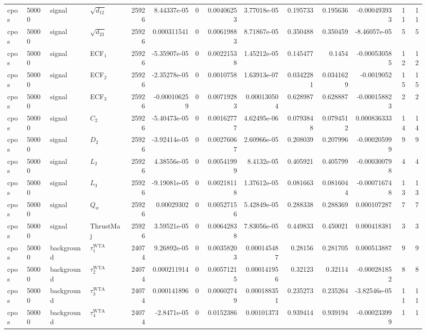 \begin{landscape}
\begin{longtable}{llll r rrrr rr r rr}
cpos & 50000 & signal & $\sqrt{d_{12}}$ & 25926 & 8.44337e-05 & 0 & 0.00406253 & 3.77018e-05 & 0.195733 & 0.195636 & -0.000493933 & 11 & 11 \\
cpos & 50000 & signal & $\sqrt{d_{23}}$ & 25926 & 0.000311541 & 0 & 0.00619883 & 8.71867e-05 & 0.350488 & 0.350459 & -8.46057e-05 & 5 & 5 \\
cpos & 50000 & signal & ECF$_1$ & 25926 & -5.35907e-05 & 0 & 0.00221538 & 1.45212e-05 & 0.145477 & 0.1454 & -0.000530585 & 12 & 12 \\
cpos & 50000 & signal & ECF$_2$ & 25926 & -2.35278e-05 & 0 & 0.0010758 & 1.63913e-07 & 0.0342281 & 0.0341629 & -0.0019052 & 15 & 15 \\
cpos & 50000 & signal & ECF$_3$ & 25926 & -0.000106259 & 0 & 0.00719283 & 0.000130504 & 0.628987 & 0.628887 & -0.000158823 & 2 & 2 \\
cpos & 50000 & signal & $C_2$ & 25926 & -5.40473e-05 & 0 & 0.00162777 & 4.62495e-06 & 0.0793848 & 0.0794512 & 0.000836333 & 14 & 14 \\
cpos & 50000 & signal & $D_2$ & 25926 & -3.92414e-05 & 0 & 0.00276067 & 2.60966e-05 & 0.208039 & 0.207996 & -0.000205999 & 9 & 9 \\
cpos & 50000 & signal & $L_2$ & 25926 & 4.38556e-05 & 0 & 0.00541999 & 8.4132e-05 & 0.405921 & 0.405799 & -0.000300798 & 4 & 4 \\
cpos & 50000 & signal & $L_3$ & 25926 & -9.19081e-05 & 0 & 0.00218118 & 1.37612e-05 & 0.081663 & 0.0816044 & -0.000716748 & 13 & 13 \\
cpos & 50000 & signal & $Q_w$ & 25926 & 0.00029302 & 0 & 0.00527156 & 5.42849e-05 & 0.288338 & 0.288369 & 0.000107287 & 7 & 7 \\
cpos & 50000 & signal & ThrustMaj & 25926 & 3.59521e-05 & 0 & 0.00642838 & 7.83056e-05 & 0.449833 & 0.450021 & 0.000418381 & 3 & 3 \\
cpos & 50000 & background & $\tau_1^{\mathrm{WTA}}$ & 24074 & 9.26892e-05 & 0 & 0.00358203 & 0.000145487 & 0.28156 & 0.281705 & 0.000513887 & 9 & 9 \\
cpos & 50000 & background & $\tau_2^{\mathrm{WTA}}$ & 24074 & 0.000211914 & 0 & 0.00571215 & 0.000141956 & 0.32123 & 0.32114 & -0.000281852 & 8 & 8 \\
cpos & 50000 & background & $\tau_3^{\mathrm{WTA}}$ & 24074 & 0.000141896 & 0 & 0.00602749 & 0.000188351 & 0.235273 & 0.235264 & -3.82546e-05 & 11 & 11 \\
cpos & 50000 & background & $\tau_4^{\mathrm{WTA}}$ & 24074 & -2.8471e-05 & 0 & 0.0152386 & 0.00101373 & 0.939414 & 0.939194 & -0.000233999 & 1 & 1 \\

\end{longtable}
\end{landscape}
